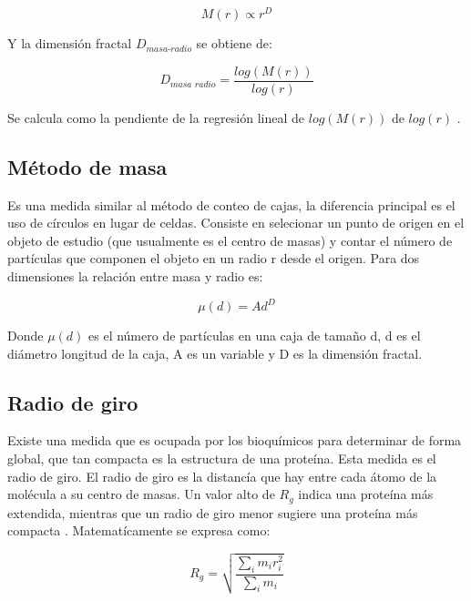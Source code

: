 \documentclass[11pt]{article}
\begin{document}
\begin{equation}
M(r) \propto r^{D} 
\end{equation}

Y la dimensi\'{o}n fractal $D_\textit{{masa-radio}}$ se obtiene de:

\begin{equation}
D_\textit{masa radio} = \frac{log (M(r))}{log (r)}
\end{equation}

Se calcula como la pendiente de la regresi\'{o}n lineal de $log(M(r))$ de $log(r)$ \cite{Mustafa1996}.


\subsection{M\'{e}todo de masa}
\label{subsec:subseccion2.5}


Es una medida similar al m\'{e}todo de conteo de cajas, 
la diferencia principal es el uso de c\'{i}rculos en lugar 
de celdas. Consiste en selecionar un punto de
 origen en el objeto de estudio (que usualmente es el centro de masas) 
 y contar el n\'{u}mero de part\'{i}culas que componen el objeto en 
 un radio r desde el origen. Para dos dimensiones la relaci\'{o}n 
 entre masa y radio es:

\begin{equation}
\mu(d) = Ad^D
\end{equation}

Donde $\mu(d)$ es el n\'{u}mero de part\'{i}culas en una caja de tamaño d, d es el di\'{a}metro longitud de la caja, A es un variable y D es la dimensi\'{o}n fractal\cite{Mustafa1996}. 

\subsection{Radio de giro}
\label{subsec:subseccion2.6}


Existe una medida que es ocupada por los bioqu\'{i}micos para determinar de forma global, que tan compacta es la estructura de una prote\'{i}na. 
Esta medida es el radio de giro. El radio de giro es la distanc\'{i}a que hay entre cada \'{a}tomo de la mol\'{e}cula a 
su centro de masas. Un valor alto de $R_g$ indica una proteína más extendida, mientras que un radio de giro menor sugiere una proteína más compacta  \cite{Mroczka2012, Vicsek1992}. 
Matemat\'{i}camente se expresa como: 

\begin{equation}
R_g = \sqrt{\frac{\sum_{i} m_{i}r_{i}^{2}}{\sum_{i} m_{i}}}
\end{equation}
\end{document}
